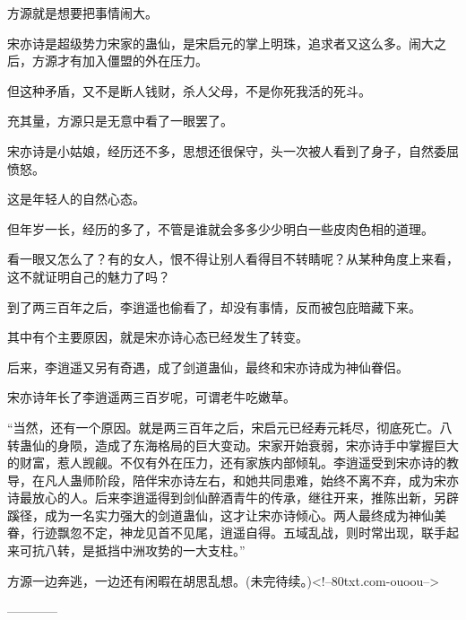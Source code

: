 \begin{this_body}
方源就是想要把事情闹大。

宋亦诗是超级势力宋家的蛊仙，是宋启元的掌上明珠，追求者又这么多。闹大之后，方源才有加入僵盟的外在压力。

但这种矛盾，又不是断人钱财，杀人父母，不是你死我活的死斗。

充其量，方源只是无意中看了一眼罢了。

宋亦诗是小姑娘，经历还不多，思想还很保守，头一次被人看到了身子，自然委屈愤怒。

这是年轻人的自然心态。

但年岁一长，经历的多了，不管是谁就会多多少少明白一些皮肉色相的道理。

看一眼又怎么了？有的女人，恨不得让别人看得目不转睛呢？从某种角度上来看，这不就证明自己的魅力了吗？

到了两三百年之后，李逍遥也偷看了，却没有事情，反而被包庇暗藏下来。

其中有个主要原因，就是宋亦诗心态已经发生了转变。

后来，李逍遥又另有奇遇，成了剑道蛊仙，最终和宋亦诗成为神仙眷侣。

宋亦诗年长了李逍遥两三百岁呢，可谓老牛吃嫩草。

“当然，还有一个原因。就是两三百年之后，宋启元已经寿元耗尽，彻底死亡。八转蛊仙的身陨，造成了东海格局的巨大变动。宋家开始衰弱，宋亦诗手中掌握巨大的财富，惹人觊觎。不仅有外在压力，还有家族内部倾轧。李逍遥受到宋亦诗的教导，在凡人蛊师阶段，陪伴宋亦诗左右，和她共同患难，始终不离不弃，成为宋亦诗最放心的人。后来李逍遥得到剑仙醉酒青牛的传承，继往开来，推陈出新，另辟蹊径，成为一名实力强大的剑道蛊仙，这才让宋亦诗倾心。两人最终成为神仙美眷，行迹飘忽不定，神龙见首不见尾，逍遥自得。五域乱战，则时常出现，联手起来可抗八转，是抵挡中洲攻势的一大支柱。”

方源一边奔逃，一边还有闲暇在胡思乱想。(未完待续。)<!--80txt.com-ouoou-->

------------

\end{this_body}

